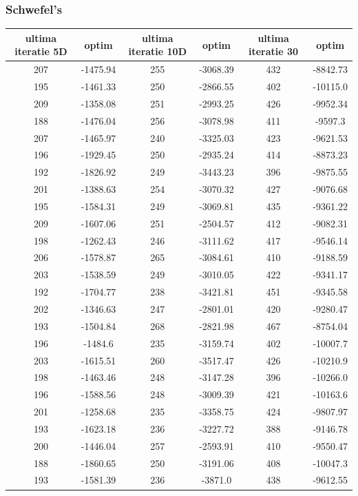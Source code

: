 \documentclass{article}
\begin{document}
\subsubsection{Schwefel’s}
\begin{tabular}{cccccc}
\hline
ultima iteratie 5D& optim&ultima iteratie 10D& optim&ultima iteratie 30&optim\\
\hline
207&-1475.94&255&-3068.39&432&-8842.73 \\ \hline
195&-1461.33&250&-2866.55&402&-10115.0 \\ \hline
209&-1358.08&251&-2993.25&426&-9952.34 \\ \hline
188&-1476.04&256&-3078.98&411&-9597.3 \\ \hline
207&-1465.97&240&-3325.03&423&-9621.53 \\ \hline
196&-1929.45&250&-2935.24&414&-8873.23 \\ \hline
192&-1826.92&249&-3443.23&396&-9875.55 \\ \hline
201&-1388.63&254&-3070.32&427&-9076.68 \\ \hline
195&-1584.31&249&-3069.81&435&-9361.22 \\ \hline
209&-1607.06&251&-2504.57&412&-9082.31 \\ \hline
198&-1262.43&246&-3111.62&417&-9546.14 \\ \hline
206&-1578.87&265&-3084.61&410&-9188.59 \\ \hline
203&-1538.59&249&-3010.05&422&-9341.17 \\ \hline
192&-1704.77&238&-3421.81&451&-9345.58 \\ \hline
202&-1346.63&247&-2801.01&420&-9280.47 \\ \hline
193&-1504.84&268&-2821.98&467&-8754.04 \\ \hline
196&-1484.6&235&-3159.74&402&-10007.7 \\ \hline
203&-1615.51&260&-3517.47&426&-10210.9 \\ \hline
198&-1463.46&248&-3147.28&396&-10266.0 \\ \hline
196&-1588.56&248&-3009.39&421&-10163.6 \\ \hline
201&-1258.68&235&-3358.75&424&-9807.97 \\ \hline
193&-1623.18&236&-3227.72&388&-9146.78 \\ \hline
200&-1446.04&257&-2593.91&410&-9550.47 \\ \hline
188&-1860.65&250&-3191.06&408&-10047.3 \\ \hline
193&-1581.39&236&-3871.0&438&-9612.55 \\ \hline

\end{tabular}
\end{document}
